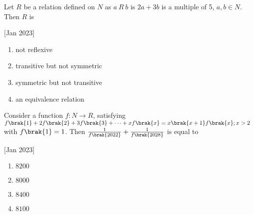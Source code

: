     \item Let $R$ be a relation defined on $N$ as $a\ R\ b$ is $2a+3b$ is a multiple of 5, $a,b\in N$. Then $R$ is
    
    \hfill[Jan 2023]

		\begin{multicols}{2}
			\begin{enumerate}
				\item not reflexive
				\item transitive but not symmetric
				\item symmetric but not transitive
				\item an equivalence relation
			\end{enumerate}
		\end{multicols}

    \item Consider a function $f:N\to R$, satisfying $f\brak{1}+2f\brak{2}+3f\brak{3}+\cdots+xf\brak{x}=x\brak{x+1}f\brak{x};x>2$ with $f\brak{1}=1$. Then $\frac{1}{f\brak{2022}}+\frac{1}{f\brak{2028}}$ is equal to 
    
    \hfill[Jan 2023]

		\begin{multicols}{4}
			\begin{enumerate}
				\item $8200$
				\item $8000$
				\item $8400$
				\item $8100$
			\end{enumerate}
		\end{multicols}
		
